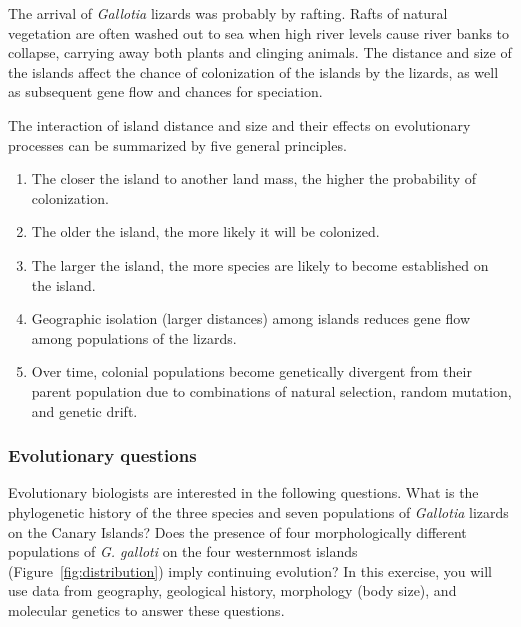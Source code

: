 \documentclass[12pt, hidelinks]{exam}
\begin{document}
The arrival of \emph{Gallotia} lizards was probably by rafting. Rafts of natural vegetation are often
washed out to sea when high river levels cause river banks to collapse,
carrying away both plants and clinging animals. The distance and size of the islands affect the chance of colonization of the islands by the lizards, as well as subsequent gene flow and chances for speciation.

The interaction of island distance and size and their effects on evolutionary processes can be summarized by five general principles.


\begin{enumerate}\label{general_principles}

	\item The closer the island to another land mass, the higher the
	probability of colonization.

	\item The older the island, the more likely it will be colonized.
	
	\item The larger the island, the more species are likely to become
	established on the island.

	\item Geographic isolation (larger distances) among islands reduces 
	gene flow among populations of the lizards.
	
	\item Over time, colonial populations become genetically divergent from
	their parent population due to combinations of natural selection, random 
	mutation, and genetic drift.

\end{enumerate} 

\subsubsection*{Evolutionary questions}

Evolutionary biologists are interested
in the following questions. What is the phylogenetic history of the three
species and seven populations of \emph{Gallotia} lizards on the Canary
Islands? Does the presence of four morphologically different populations
of \emph{G. galloti} on the four westernmost islands
(Figure~\ref{fig:distribution}) imply continuing evolution? In this
exercise, you will use data from geography, geological history,
morphology (body size), and molecular genetics to answer
these questions.
\end{document}
